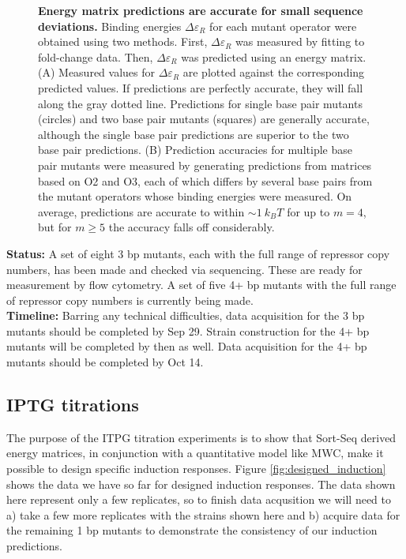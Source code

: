 \documentclass[10pt,letterpaper]{article}
\begin{document}
\begin{figure}[ht!]
\begin{center}
\caption{\textbf{Energy matrix predictions are accurate for small sequence
deviations.} Binding energies $\Delta \varepsilon_R$ for each mutant operator
were obtained using two methods. First, $\Delta \varepsilon_R$ was measured by
fitting to fold-change data. Then, $\Delta \varepsilon_R$ was predicted using
an energy matrix. (A) Measured values for $\Delta \varepsilon_R$ are plotted
against the corresponding predicted values. If predictions are perfectly
accurate, they will fall along the gray dotted line. Predictions for single
base pair mutants (circles) and two base pair mutants (squares) are generally
accurate, although the single base pair predictions are superior to the two
base pair predictions. (B) Prediction accuracies for multiple base pair mutants
were measured by generating predictions from matrices based on O2 and O3, each
of which differs by several base pairs from the mutant operators whose binding
energies were measured. On average, predictions are accurate to within $\sim 1\
k_BT$ for up to $m = 4$, but for $m \geq 5$ the accuracy falls off
considerably. }
\label{fig:pred_v_fit}
\end{center}
\end{figure}

\noindent \textbf{Status:} A set of eight 3 bp mutants, each with the full range of
repressor copy numbers, has been made and checked via sequencing. These are
ready for measurement by flow cytometry. A set of five 4+ bp mutants with the
full range of repressor copy numbers is currently being made.\\

\noindent \textbf{Timeline:} Barring any technical difficulties, data
acquisition for the 3 bp mutants should be completed by Sep 29. Strain
construction for the 4+ bp mutants will be completed by then as well. Data
acquisition for the 4+ bp mutants should be completed by Oct 14.

\subsection*{IPTG titrations}

The purpose of the ITPG titration experiments is to show that Sort-Seq derived
energy matrices, in conjunction with a quantitative model like MWC, make it
possible to design specific induction responses. Figure
\ref{fig:designed_induction} shows the data we have so far for designed
induction responses. The data shown here represent only a few replicates, so to
finish data acqusition we will need to a) take a few more replicates with the
strains shown here and b) acquire data for the remaining 1 bp mutants to
demonstrate the consistency of our induction predictions.\\
\end{document}
